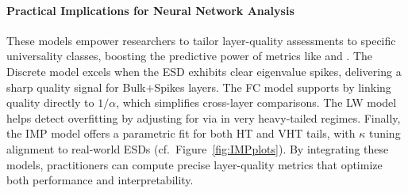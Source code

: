 \paragraph{Practical Implications for Neural Network Analysis}
These models empower researchers to tailor layer-quality assessments to specific \HTSR universality classes, boosting the predictive power of \WW metrics like \ALPHA and \ALPHAHAT. The Discrete model excels when the ESD exhibits clear eigenvalue spikes, delivering a sharp quality signal for Bulk$+$Spikes layers. The FC model supports \IdealLearning by linking quality directly to \(1/\alpha\), which simplifies cross-layer comparisons. The LW model helps detect overfitting by adjusting for \CorrelationTraps via \ALPHAHAT in very heavy-tailed regimes. Finally, the IMP model offers a parametric fit for both HT and VHT tails, with \(\kappa\) tuning alignment to real-world ESDs (cf.\ Figure~\ref{fig:IMPplots}). By integrating these models, practitioners can compute precise layer-quality metrics that optimize both performance and interpretability.
